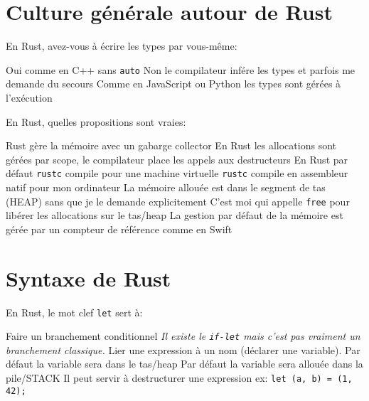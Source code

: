 \documentclass[11pt,a4paper,addpoint,answers]{exam}
\begin{document}
  \begin{questions}

    \section{Culture générale autour de Rust}

    \question[1] En Rust, avez-vous à écrire les types par vous-même:
    \begin{checkboxes}
        \choice Oui comme en C++ sans \texttt{auto}
        \CorrectChoice Non le compilateur infére les types et parfois me demande du secours
        \choice Comme en JavaScript ou Python les types sont gérées à l'exécution
    \end{checkboxes}

    \question[1] En Rust, quelles propositions sont vraies:
    \begin{checkboxes}
        \choice Rust gère la mémoire avec un gabarge collector
        \CorrectChoice En Rust les allocations sont gérées par scope, le compilateur place les appels aux destructeurs
        \choice En Rust par défaut \texttt{rustc} compile pour une machine virtuelle
        \CorrectChoice \texttt{rustc} compile en assembleur natif pour mon ordinateur
        \choice La mémoire allouée est dans le segment de tas (HEAP) sans que je le demande explicitement
        \choice C'est moi qui appelle \texttt{free} pour libérer les allocations sur le tas/heap
        \choice La gestion par défaut de la mémoire est gérée par un compteur de référence comme en Swift
    \end{checkboxes}
\newpage
    \section{Syntaxe de Rust}

    \question[1] En Rust, le mot clef \texttt{let} sert à:
    \begin{checkboxes}
        \choice Faire un branchement conditionnel \emph{Il existe le \texttt{if-let} mais c'est pas vraiment un branchement classique.}
        \CorrectChoice Lier une expression à un nom (déclarer une variable).
        \choice Par défaut la variable sera dans le tas/heap
        \CorrectChoice Par défaut la variable sera allouée dans la pile/STACK
        \CorrectChoice Il peut servir à destructurer une expression ex: \texttt{let (a, b) = (1, 42);}
    \end{checkboxes}


\end{questions}
\end{document}
